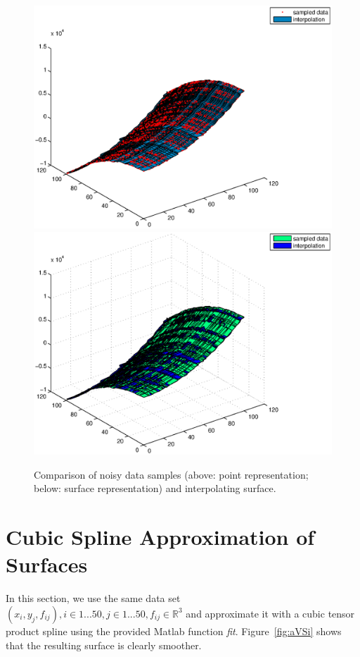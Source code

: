 \documentclass[12pt,a4paper]{article}
\begin{document}
\begin{figure}[hbtp]
\centering
\includegraphics[width=\textwidth]{sampledVSInterpol.eps}
\includegraphics[width=\textwidth]{sampledVSInterpolSurf.eps}
\caption{Comparison of noisy data samples (above: point representation; below: surface representation) and  interpolating surface.}
\label{fig:sVSi}
\end{figure}


\section{Cubic Spline Approximation of Surfaces}

In this section, we use the same data set $(x_i, y_j, f_{ij}), i\in 1...50, j\in 1...50,  f_{ij}\in\mathbb{R}^3$ and approximate it with a cubic tensor product spline using the provided Matlab function \textit{fit}. Figure~\ref{fig:aVSi} shows that the resulting surface is clearly smoother.
\end{document}

